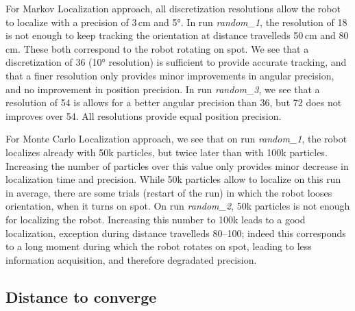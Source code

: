\documentclass[letterpaper, 10pt, conference]{ieeeconf}
\begin{document}
For Markov Localization approach, all discretization resolutions allow the robot to localize with a precision of 3\,cm and 5°.
In run \emph{random\_1}, the resolution of 18 is not enough to keep tracking the orientation at distance travelleds 50\,cm and 80\,cm.
These both correspond to the robot rotating on spot.
We see that a discretization of 36 (10° resolution) is sufficient to provide accurate tracking, and that a finer resolution only provides minor improvements in angular precision, and no improvement in position precision.
In run \emph{random\_3}, we see that a resolution of 54 is allows for a better angular precision than 36, but 72 does not improves over 54.
All resolutions provide equal position precision.

For Monte Carlo Localization approach, we see that on run \emph{random\_1}, the robot localizes already with 50k particles, but twice later than with 100k particles.
Increasing the number of particles over this value only provides minor decrease in localization time and precision.
While 50k particles allow to localize on this run in average, there are some trials (restart of the run) in which the robot looses orientation, when it turns on spot.
On run \emph{random\_2}, 50k particles is not enough for localizing the robot.
Increasing this number to 100k leads to a good localization, exception during distance travelleds 80--100; indeed this corresponds to a long moment during which the robot rotates on spot, leading to less information acquisition, and therefore degradated precision.

\subsection{Distance to converge}
\end{document}
